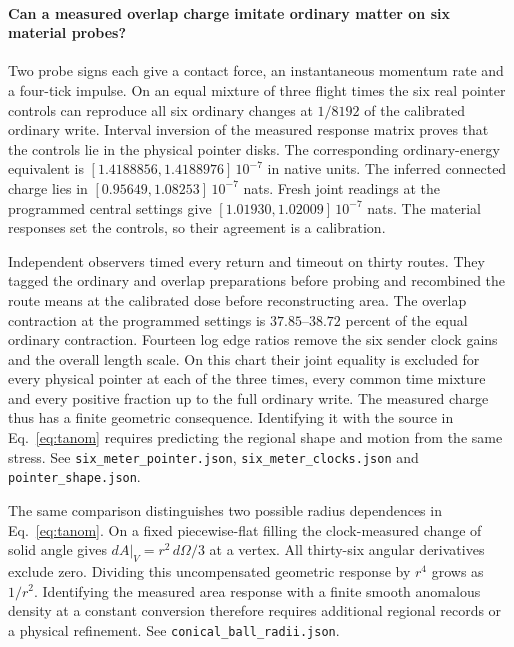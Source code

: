 \documentclass[11pt]{article}
\begin{document}
\paragraph{Can a measured overlap charge imitate ordinary matter on six material probes?}
Two probe signs each give a contact force, an instantaneous momentum rate
and a four-tick impulse. On an equal mixture of three flight times the
six real pointer controls can reproduce all six ordinary changes at
\(1/8192\) of the calibrated ordinary write. Interval inversion of the
measured response matrix proves that the controls lie in the physical
pointer disks. The corresponding ordinary-energy equivalent is
\([1.4188856,1.4188976]\,10^{-7}\) in native units. The inferred
connected charge lies in \([0.95649,1.08253]\,10^{-7}\) nats.
Fresh joint readings at the programmed central settings give
\([1.01930,1.02009]\,10^{-7}\) nats. The material responses set the
controls, so their agreement is a calibration.

Independent observers timed every return and timeout on thirty routes.
They tagged the ordinary and overlap preparations before probing and
recombined the route means at the calibrated dose before reconstructing
area. The overlap contraction at the programmed settings is
\(37.85\)--\(38.72\) percent of the equal ordinary contraction.
Fourteen log edge ratios remove the six sender clock gains and the
overall length scale. On this chart their joint equality is excluded
for every physical pointer at each of the three times, every common
time mixture and every positive fraction up to the full ordinary
write. The measured charge thus has a finite geometric consequence.
Identifying it with the source in Eq.~\eqref{eq:tanom} requires
predicting the regional shape and motion from the same stress. See
\texttt{six\_meter\_pointer.json}, \texttt{six\_meter\_clocks.json}
and \texttt{pointer\_shape.json}.

The same comparison distinguishes two possible radius dependences
in Eq.~\eqref{eq:tanom}. On a fixed piecewise-flat filling the
clock-measured change of solid angle gives
\(dA|_V=r^2\,d\Omega/3\) at a vertex. All thirty-six angular
derivatives exclude zero. Dividing this uncompensated geometric
response by \(r^4\) grows as \(1/r^2\). Identifying the measured
area response with a finite smooth anomalous density at a constant
conversion therefore requires additional regional records or a
physical refinement. See \texttt{conical\_ball\_radii.json}.
\end{document}
